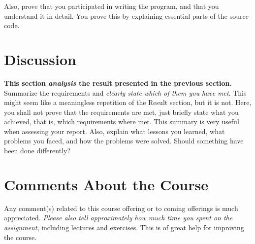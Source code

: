 \documentclass[a4paper]{scrartcl}
\begin{document}
Also, prove that you participated in writing the program, and that you understand it in detail. You prove this by explaining essential parts of the source code.

\pagebreak

\section{Discussion}

\textbf{This section \textit{analysis} the result presented in the previous section.} \\

\noindent Summarize the requirements and \textit{clearly state which of them you have met}. This might seem like a meaningless repetition of the Result section, but it is not. Here, you shall not prove that the requirements are met, just briefly state what you achieved, that is, which requirements where met. This summary is very useful when assessing your report. Also, explain what lessons you learned, what problems you faced, and how the problems were solved. Should something have been done differently?

\section{Comments About the Course}

Any comment(s) related to this course offering or to coming offerings is much appreciated. \textit{Please also tell approximately how much time you spent on the assignment}, including lectures and exercises. This is of great help for improving the course.
\end{document}
